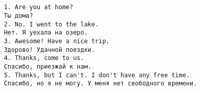 \subsection*{}
\begin{verbatim}
    1. Are you at home?
    Ты дома?
    2. No. I went to the lake.
    Нет. Я уехала на озеро.
    3. Awesome! Have a nice trip.
    Здорово! Удачной поездки.
    4. Thanks, come to us.
    Спасибо, приезжай к нам.
    5. Thanks, but I can't. I don't have any free time.
    Спасибо, но я не могу. У меня нет свободного времени.
\end{verbatim}